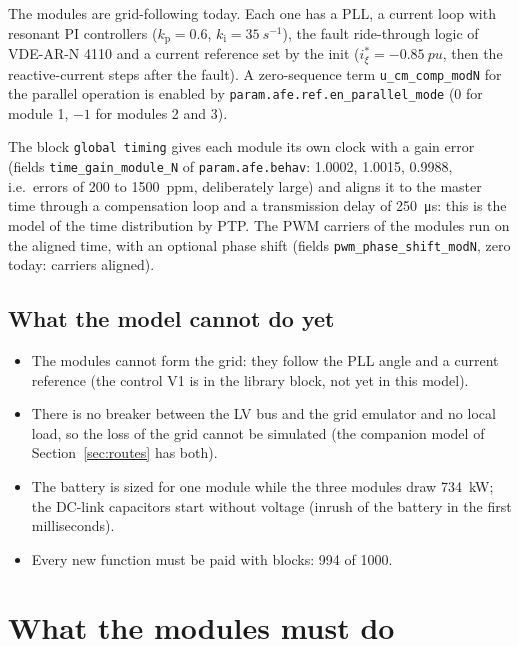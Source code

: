 \documentclass[11pt,a4paper]{scrartcl}
\newcommand{\ped}[1]{_{\mathrm{#1}}}
\newcommand{\code}[1]{\texttt{#1}}
\begin{document}
\begin{onehalfspace}
The modules are grid-following today. Each one has a PLL, a current loop with resonant PI controllers ($k\ped{p} = 0.6$, $k\ped{i} = \SI{35}{s^{-1}}$), the fault ride-through logic of VDE-AR-N 4110 and a current reference set by the init ($i_\xi^* = \SI{-0.85}{pu}$, then the reactive-current steps after the fault). A zero-sequence term \code{u\_cm\_comp\_modN} for the parallel operation is enabled by \code{param.afe.ref.en\_parallel\_mode} (0 for module 1, $-1$ for modules 2 and 3).

The block \code{global timing} gives each module its own clock with a gain error (fields \code{time\_gain\_module\_N} of \code{param.afe.behav}: 1.0002, 1.0015, 0.9988, i.e.\ errors of 200 to \SI{1500}{ppm}, deliberately large) and aligns it to the master time through a compensation loop and a transmission delay of \SI{250}{\micro s}: this is the model of the time distribution by PTP. The PWM carriers of the modules run on the aligned time, with an optional phase shift (fields \code{pwm\_phase\_shift\_modN}, zero today: carriers aligned).

\subsection{What the model cannot do yet}

\begin{itemize}[nosep]
	\item The modules cannot form the grid: they follow the PLL angle and a current reference (the control V1 is in the library block, not yet in this model).
	\item There is no breaker between the LV bus and the grid emulator and no local load, so the loss of the grid cannot be simulated (the companion model of Section~\ref{sec:routes} has both).
	\item The battery is sized for one module while the three modules draw \SI{734}{\kilo\watt}; the DC-link capacitors start without voltage (inrush of the battery in the first milliseconds).
	\item Every new function must be paid with blocks: 994 of 1000.
\end{itemize}

\section{What the modules must do}
\label{sec:requirements}


\end{onehalfspace}
\end{document}
